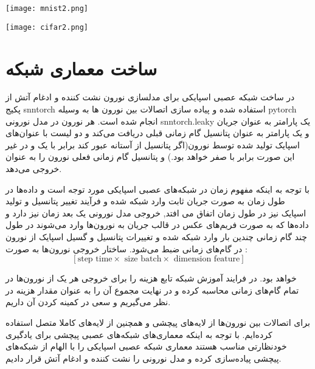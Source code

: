 \begin{minipage}{\linewidth}
	\centering
	\texttt{[image: mnist2.png]}
	\label{fig:data3}
\end{minipage}

\begin{minipage}{\linewidth}
	\centering
	\texttt{[image: cifar2.png]}
	\captionsetup{font=small} %
	\label{fig:data4}
\end{minipage}



\section{ساخت معماری شبکه}

 در ساخت شبکه عصبی اسپایکی برای مدلسازی نورون نشت کننده و ادغام آتش از پکیج snntorch  استفاده شده و  پیاده سازی اتصالات بین نورون ها به وسیله pytorch انجام شده است.
 هر نورون در مدل نورونی snntorch.leaky یک پارامتر به عنوان جریان و یک پارامتر به عنوان پتانسیل گام زمانی قبلی دریافت می‌کند و دو لیست با عنوان‌های اسپایک تولید شده توسط نورون(اگر پتانسیل از آستانه عبور کند برابر با یک و در غیر این صورت برابر با صفر خواهد بود.) و پتانسیل گام زمانی فعلی نورون را به عنوان خروجی می‌دهد. 
 \citep{eshraghian2021training}
 
 با توجه به اینکه مفهوم زمان در شبکه‌های عصبی اسپایکی مورد توجه است و داده‌ها در طول زمان به صورت جریان ثابت وارد شبکه شده و فرآیند تغییر پتانسیل و تولید اسپایک نیز در طول زمان اتفاق می افتد, خروجی مدل نورونی یک بعد زمان نیز دارد و داده‌ها که به صورت فریم‌های عکس در قالب جریان به نورون‌ها وارد می‌شوند در طول چند گام زمانی چندین بار وارد شبکه شده و تغییرات پتانسیل و گسیل اسپایک از نورون در گام‌های زمانی ضبط می‌شود.
 ساختار خروجی نورون‌ها به صورت :
\[
\left[ \text{step time} \times \text{ size batch} \times \text{ dimension feature} \right]
\]
 
 خواهد بود. در فرایند آموزش شبکه تابع هزینه را برای خروجی هر یک از نورون‌ها در تمام گام‌های زمانی محاسبه کرده و در نهایت مجموع آن را به عنوان مقدار هزینه در نظر می‌گیریم و سعی در کمینه کردن آن داریم.
 
  برای اتصالات بین نورون‌ها از لایه‌های پیچشی و همچنین از لایه‌های کاملا متصل استفاده کرده‌ایم. با توجه به اینکه معماری‌های شبکه‌های عصبی پیچشی برای یادگیری خودنظارتی مناسب هستند معماری شبکه عصبی اسپایکی را با الهام از شبکه‌های پیچشی پیاده‌سازی کرده و مدل نورونی را نشت کننده و ادغام آتش قرار دادیم.

